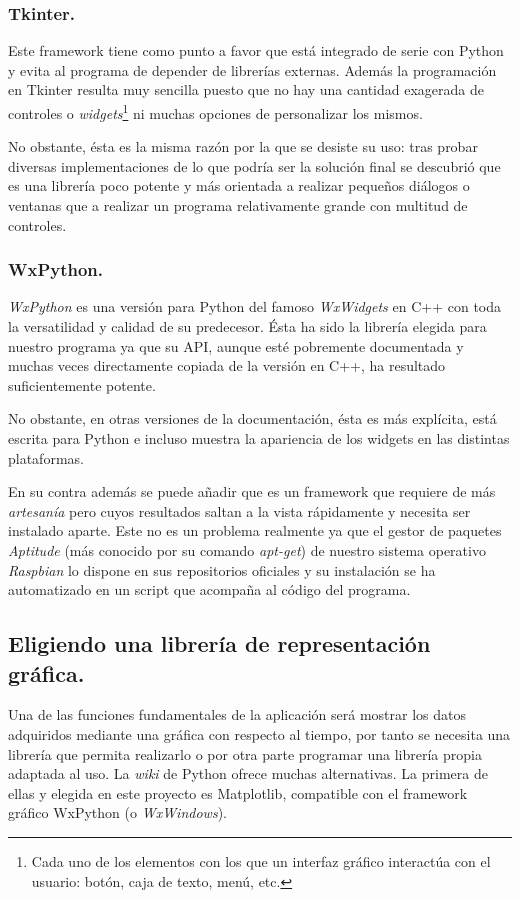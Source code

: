 \subsubsection{Tkinter.}
	Este framework tiene como punto a favor que está integrado de serie con Python y evita al programa de depender de librerías externas. Además la programación en Tkinter\cite{effbot_introductiontkinter} resulta muy sencilla puesto que no hay una cantidad exagerada de controles o \emph{widgets}\footnote{Cada uno de los elementos con los que un interfaz gráfico interactúa con el usuario: botón, caja de texto, menú, etc.} ni muchas opciones de personalizar los mismos.
	
	 No obstante, ésta es la misma razón por la que se desiste su uso: tras probar diversas implementaciones de lo que podría ser la solución final se descubrió que es una librería poco potente y más orientada a realizar pequeños diálogos o ventanas que a realizar un programa relativamente grande con multitud de controles.
	
\subsubsection{WxPython.}
		\emph{WxPython} es una versión para Python del famoso \emph{WxWidgets}\cite{wxwidgets} en C++ con toda la versatilidad y calidad de su predecesor. Ésta ha sido la librería elegida para nuestro programa ya que su API, aunque esté pobremente documentada\cite{wxpython_apifea} y muchas veces directamente copiada de la versión en C++, ha resultado suficientemente potente.		
		
		No obstante, en otras versiones\cite{wxpython_apiphoenix} de la documentación, ésta es más explícita, está escrita para Python e incluso muestra la apariencia de los widgets en las distintas plataformas.
		
	En su contra además se puede añadir que es un framework que requiere de más \emph{artesanía} pero cuyos resultados saltan a la vista rápidamente y necesita ser instalado aparte. Este no es un problema realmente ya que el gestor de paquetes \emph{Aptitude} (más conocido por su comando \emph{apt-get}) de nuestro sistema operativo \emph{Raspbian} lo dispone en sus repositorios oficiales y su instalación se ha automatizado en un script que acompaña al código del programa.
	
\subsection{Eligiendo una librería de representación gráfica.}
	Una de las funciones fundamentales de la aplicación será mostrar los datos adquiridos mediante una gráfica con respecto al tiempo, por tanto se necesita una librería que permita realizarlo o por otra parte programar una librería propia adaptada al uso. La \emph{wiki} de Python\cite{wikipython_plotting} ofrece muchas alternativas. La primera de ellas y elegida en este proyecto es Matplotlib, compatible con el framework gráfico WxPython (o \emph{WxWindows}).
	
